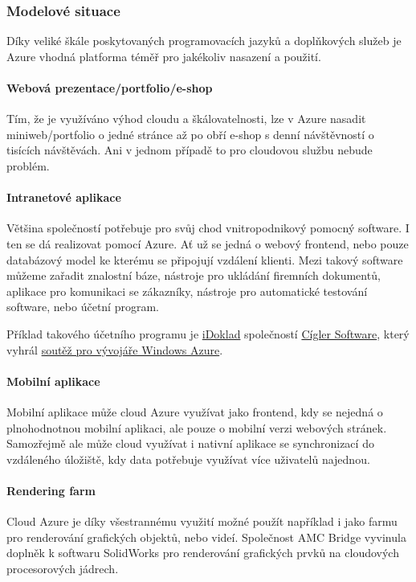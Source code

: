 \subsubsection{Modelové situace}
Díky veliké škále poskytovaných programovacích jazyků a doplňkových služeb je Azure vhodná platforma téměř pro jakékoliv nasazení a použití.

\paragraph{Webová prezentace/portfolio/e-shop}
Tím, že je využíváno výhod cloudu a škálovatelnosti, lze v Azure nasadit miniweb/portfolio o jedné stránce až po obří e-shop s denní návštěvností o tisících návštěvách. Ani v jednom případě to pro cloudovou službu nebude problém.

\paragraph{Intranetové aplikace}
Většina společností potřebuje pro svůj chod vnitropodnikový pomocný software. I ten se dá realizovat pomocí Azure. Ať už se jedná o webový frontend, nebo pouze databázový model ke kterému se připojují vzdálení klienti. Mezi takový software můžeme zařadit znalostní báze, nástroje pro ukládání firemních dokumentů, aplikace pro komunikaci se zákazníky, nástroje pro automatické testování software, nebo účetní program.

Příklad takového účetního programu je \href{https://www.idoklad.cz}{iDoklad} společností \href{http://www.money.cz/}{Cígler Software}, který vyhrál \href{http://startup.lupa.cz/clanky/pate-kolo-souteze-pro-vyvojare-windows-azure-vyhrala-aplikace-idoklad/}{soutěž pro vývojáře Windows Azure\cite{lupa:iDoklad}}.

\paragraph{Mobilní aplikace}
Mobilní aplikace může cloud Azure využívat jako frontend, kdy se nejedná o plnohodnotnou mobilní aplikaci, ale pouze o mobilní verzi webových stránek. Samozřejmě ale může cloud využívat i nativní aplikace se synchronizací do vzdáleného úložiště, kdy data potřebuje využívat více uživatelů najednou.

\paragraph{Rendering farm}
Cloud Azure je díky všestrannému využití možné použít například i jako farmu pro renderování grafických objektů, nebo videí. Společnost AMC Bridge vyvinula doplněk k softwaru SolidWorks pro renderování grafických prvků na cloudových procesorových jádrech.\cite{amcbridge:cloudRender}


